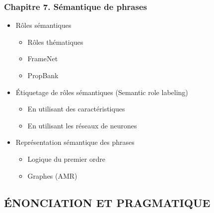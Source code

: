 \documentclass[11pt, a4paper]{article}
\begin{document}
\begin{tcolorbox}
\subsubsection*{Chapitre 7. Sémantique de phrases}

\begin{multicols}{2}
	\begin{itemize}
		
		\item Rôles sémantiques
		\begin{itemize}
			\item Rôles thématiques
			\item FrameNet 
			\item PropBank	
		\end{itemize}
	
		\item Étiquetage de rôles sémantiques (Semantic role labeling)
		\begin{itemize}
			\item En utilisant des caractéristiques
			\item En utilisant les réseaux de neurones
		\end{itemize}
		
		\item Représentation sémantique des phrases
		\begin{itemize}
			\item Logique du premier ordre
			\item Graphes (AMR)
		\end{itemize}
		
	\end{itemize}
\end{multicols}
\end{tcolorbox}

\subsection*{\uppercase{Énonciation et pragmatique}}
\end{document}
